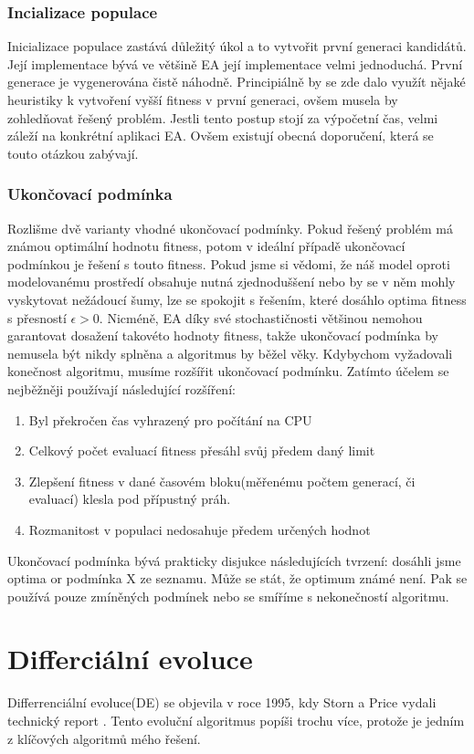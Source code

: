 \subsubsection{Incializace populace}
Inicializace populace zastává důležitý úkol a to vytvořit první generaci kandidátů. Její implementace bývá ve většině EA její implementace velmi jednoduchá. První generace je vygenerována čistě náhodně. Principiálně by se zde dalo využít nějaké heuristiky k vytvoření vyšší fitness v první generaci, ovšem musela by zohledňovat řešený problém. Jestli tento postup stojí za výpočetní čas, velmi záleží na konkrétní aplikaci EA. Ovšem existují obecná doporučení, která se touto otázkou zabývají. 
\subsubsection{Ukončovací podmínka}
Rozlišme dvě varianty vhodné ukončovací podmínky. Pokud řešený problém má známou optimální hodnotu fitness, potom v ideální případě ukončovací podmínkou je řešení s touto fitness. Pokud jsme si vědomi, že náš model oproti modelovanému prostředí obsahuje nutná zjednoduššení nebo by se v něm mohly vyskytovat nežádoucí šumy, lze se spokojit s řešením, které dosáhlo optima fitness s přesností $\epsilon > 0$. Nicméně, EA díky své stochastičnosti většinou nemohou garantovat dosažení takovéto hodnoty fitness, takže ukončovací podmínka by nemusela být nikdy splněna a algoritmus by běžel věky. Kdybychom vyžadovali konečnost algoritmu, musíme rozšířit ukončovací podmínku. Zatímto účelem se nejběžněji používají následující rozšíření: \par
\begin{enumerate}
\item Byl překročen čas vyhrazený pro počítání na CPU
\item Celkový počet evaluací fitness přesáhl svůj předem daný limit 
\item Zlepšení fitness v dané časovém bloku(měřenému počtem generací, či evaluací) klesla pod přípustný práh.
\item Rozmanitost v populaci nedosahuje předem určených hodnot
\end{enumerate}
Ukončovací podmínka bývá prakticky disjukce následujících tvrzení: dosáhli jsme optima or podmínka X ze seznamu. Může se stát, že optimum známé není. Pak se používá pouze zmíněných podmínek nebo se smíříme s nekonečností algoritmu. 

\section{Differciální evoluce}
Differrenciální evoluce(DE) se objevila v roce 1995, kdy Storn a Price vydali technický report \cite{Storn1997}. Tento evoluční algoritmus popíši trochu více, protože je jedním z klíčových algoritmů mého řešení. 
